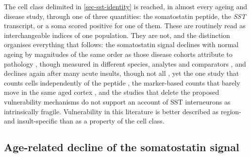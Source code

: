 \documentclass[11pt]{article}
\begin{document}
The cell class delimited in \ref{sec-sst-identity} is reached, in almost every ageing and disease study, through one of three quantities: the somatostatin peptide, the \emph{SST} transcript, or a soma scored positive for one of them. These are routinely read as interchangeable indices of one population. They are not, and the distinction organises everything that follows: the somatostatin signal declines with normal ageing by magnitudes of the same order as those disease cohorts attribute to pathology \citep{Hayashi1997,Florio1991}, though measured in different species, analytes and comparators \citep{Poirel2018}, and declines again after many acute insults, though not all \citep{Johansen1987,Freund1992}, yet the one study that counts cells independently of the peptide \citep{Komitova2013}, the marker-based counts that barely move in the same aged cortex \citep{Cha1997}, and the studies that delete the proposed vulnerability mechanisms \citep{Bouilleret2000} do not support an account of SST interneurons as intrinsically fragile. Vulnerability in this literature is better described as region- and insult-specific than as a property of the cell class.

\subsection{Age-related decline of the somatostatin signal}
\label{sec-03-aging-baseline}
\end{document}
